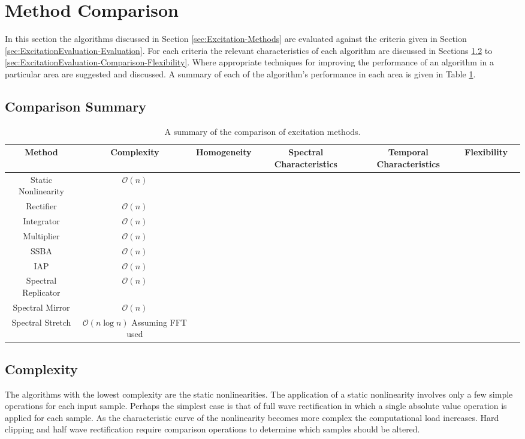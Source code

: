 \section{Method Comparison}
\label{sec:ExcitationEvaluation-Comparison}
	In this section the algorithms discussed in Section \ref{sec:Excitation-Methods} are evaluated against the criteria
	given in Section \ref{sec:ExcitationEvaluation-Evaluation}. For each criteria the relevant characteristics of each
	algorithm are discussed in Sections \ref{sec:ExcitationEvaluation-Comparison-Complexity} to
	\ref{sec:ExcitationEvaluation-Comparison-Flexibility}. Where appropriate techniques for improving the performance of
	an algorithm in a particular area are suggested and discussed. A summary of each of the algorithm's performance in
	each area is given in Table \ref{tab:ComparisonSummary}.

	\begin{landscape}
	\subsection{Comparison Summary}
	\label{sec:ExcitationEvaluation-Comparison-Summary}
		\begin{table}[h!]
			\centering
			\begin{tabular}{|c|c|c|c|c|c|c|}
				\hline
				\bf{Method} & \bf{Complexity} & \bf{Homogeneity} & \bf{Spectral Characteristics} & 
				\bf{Temporal Characteristics} & \bf{Flexibility} \tabularnewline 
				\hline
				\hline
				Static Nonlinearity & $\mathcal{O}(n)$ & & & & \tabularnewline
				\hline
				Rectifier & $\mathcal{O}(n)$ & & & & \tabularnewline
				\hline
				Integrator & $\mathcal{O}(n)$ & & & & \tabularnewline
				\hline
				Multiplier & $\mathcal{O}(n)$ & & & & \tabularnewline
				\hline
				SSBA & $\mathcal{O}(n)$ & & & & \tabularnewline
				\hline
				IAP & $\mathcal{O}(n)$ & & & & \tabularnewline
				\hline
				Spectral Replicator & $\mathcal{O}(n)$ & & & & \tabularnewline
				\hline
				Spectral Mirror & $\mathcal{O}(n)$ & & & & \tabularnewline
				\hline
				Spectral Stretch & $\mathcal{O}(n\log{n})$ Assuming FFT used & & & & \tabularnewline
				\hline
			\end{tabular}
			\caption{A summary of the comparison of excitation methods.}
			\label{tab:ComparisonSummary}
		\end{table}
	\end{landscape}

	\subsection{Complexity}
	\label{sec:ExcitationEvaluation-Comparison-Complexity}
		The algorithms with the lowest complexity are the static nonlinearities. The application of a static
		nonlinearity involves only a few simple operations for each input sample. Perhaps the simplest case is that
		of full wave rectification in which a single absolute value operation is applied for each sample. As the
		characteristic curve of the nonlinearity becomes more complex the computational load increases. Hard
		clipping and half wave rectification require comparison operations to determine which samples should be
		altered. 

